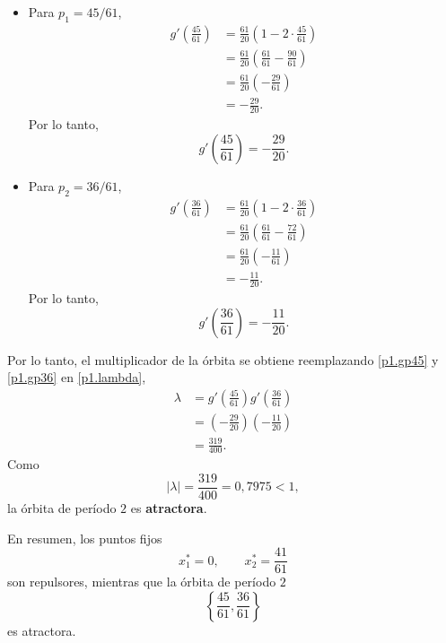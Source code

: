 \documentclass[12pt]{article}
\begin{document}
\begin{itemize}
    \item Para $p_1=45/61$,
        \begin{align*}
            g'\left(\frac{45}{61}\right)
            &=
            \frac{61}{20}\left(1-2\cdot\frac{45}{61}\right)\\
            &=
            \frac{61}{20}\left(\frac{61}{61}-\frac{90}{61}\right)\\
            &=
            \frac{61}{20}\left(-\frac{29}{61}\right)\\
            &=
            -\frac{29}{20}.
        \end{align*}
    Por lo tanto,
    \begin{equation}\label{p1.gp45}
        g'\left(\frac{45}{61}\right)=
            -\frac{29}{20}.
    \end{equation}
\item Para $p_2=36/61$,
        \begin{align*}
        g'\left(\frac{36}{61}\right)
        &=
        \frac{61}{20}\left(1-2\cdot\frac{36}{61}\right)\\
        &=
        \frac{61}{20}\left(\frac{61}{61}-\frac{72}{61}\right)\\
        &=
        \frac{61}{20}\left(-\frac{11}{61}\right)\\
        &=
        -\frac{11}{20}.
        \end{align*}
    Por lo tanto,
    \begin{equation}\label{p1.gp36}
        g'\left(\frac{36}{61}\right)=
        -\frac{11}{20}.
    \end{equation}
\end{itemize}
Por lo tanto, el multiplicador de la órbita se obtiene reemplazando \eqref{p1.gp45} y \eqref{p1.gp36} en \eqref{p1.lambda}, 
\begin{align*}
\lambda
&=
g'\left(\frac{45}{61}\right)
g'\left(\frac{36}{61}\right)\\
&=
\left(-\frac{29}{20}\right)
\left(-\frac{11}{20}\right)\\
&=
\frac{319}{400}.
\end{align*}
Como
\begin{equation*}
|\lambda|=\frac{319}{400}=0{,}7975<1,
\end{equation*}
la órbita de período $2$ es \textbf{atractora}.

En resumen, los puntos fijos
\begin{equation*}
x_1^*=0,
\qquad
x_2^*=\frac{41}{61}
\end{equation*}
son repulsores, mientras que la órbita de período $2$
\begin{equation*}
\left\{\frac{45}{61},\frac{36}{61}\right\}
\end{equation*}
es atractora.
\end{document}
